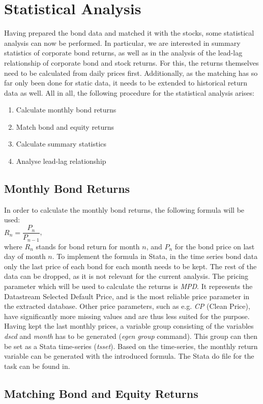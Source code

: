 \chapter{Statistical Analysis} \label{chapter:statistical-analysis}
Having prepared the bond data and matched it with the stocks, some statistical analysis can now be performed. In particular, we are interested in summary statistics of corporate bond returns, as well as in the analysis of the lead-lag relationship of corporate bond and stock returns. For this, the returns themselves need to be calculated from daily prices first. Additionally, as the matching has so far only been done for static data, it needs to be extended to historical return data as well. All in all, the following procedure for the statistical analysis arises: 
\begin{enumerate}
	\item Calculate monthly bond returns
	\item Match bond and equity returns
	\item Calculate summary statistics
	\item Analyse lead-lag relationship
\end{enumerate}

\section{Monthly Bond Returns}
In order to calculate the monthly bond returns, the following formula will be used: \\
$R_{n} = \dfrac{P_{n}}{P_{n-1}}$, \\ where $R_{n}$ stands for bond return for month $n$, and $P_{n}$ for the bond price on last day of month $n$. 
To implement the formula in Stata, in the time series bond data only the last price of each bond for each month needs to be kept. The rest of the data can be dropped, as it is not relevant for the current analysis. The pricing parameter which will be used to calculate the returns is \textit{MPD}. It represents the Datastream Selected Default Price, and is the most reliable price parameter in the extracted database. Other price parameters, such as e.g. \textit{CP} (Clean Price), have significantly more missing values and are thus less suited for the purpose. Having kept the last monthly prices, a variable group consisting of the variables \textit{dscd} and \textit{month} has to be generated (\textit{egen} \textit{group} command). This group can then be set as a Stata time-series (\textit{tsset}). Based on the time-series, the monthly return variable can be generated with the introduced formula. The Stata do file for the task can be found in. %

\section{Matching Bond and Equity Returns}








